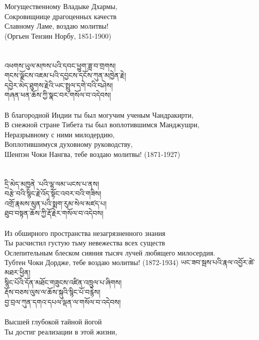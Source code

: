 Могущественному Владыке Дхармы, \\
Сокровищнице драгоценных качеств \\
Славному Ламе, воздаю молитвы! \\ 
\hspace{1cm} (Оргьен Тензин Норбу, 1851-1900)\\
\\
\\
\ti
འཕགས་ཡུལ་མཁས་པའི་དབང་ཕྱུག་ཟླ་བ་གྲགས། \\
གངས་ལྗོངས་འཇམ་པའི་དབྱངས་དངོས་ཀུན་མཁྱེན་རྗེ། \\
དབྱེར་མེད་ཐུགས་རྗེའི་ཡང་སྤྲུལ་དགེ་བའི་བཤེས། \\
གཞན་ཕན་ཆོས་ཀྱི་སྣང་བར་གསོལ་བ་འདེབས།\\
\\
\ru
В благородной Индии ты был могучим ученым Чандракирти,\\
В снежной стране Тибета ты был воплотившимся Манджушри,\\
Неразрывному с ними милодердию, \\
Воплотившимуся духовному руководству, \\
Шенпэн Чоки Нангва, тебе воздаю молитвы! (1871-1927)\\
\\
\\
\ti
དྲི་མེད་མཁྱནེ ་པའི་ལྷ་ལམ་ཡངས་པ་ནས། \\
བརྩེ་བའི་སྙིང་རྗེ་འོད་སྟོང་འབར་བའི་གཟིས། \\
འགྲོ་རྣམས་མུན་པའི་སྨག་རུམ་སེལ་མཛད་པ། \\
ཐུབ་བསྟན་ཆོས་ཀྱི་རྡོ་རྗེར་གསོལ་བ་འདེབས།\\
\\
\ru
Из обширного пространства незагрязненного знания\\
Ты расчистил густую тьму невежества всех существ\\
Ослепительным блеском сияния тысяч лучей любящего милосердия. \\
Тубтен Чоки Дордже, тебе воздаю молитвы! (1872-1934)
\newpage
\ti
ཡང་ཟབ་སྦས་པའི་རྣལ་འབྱོར་ཚེ་མཐར་ཕྱིན། \\
སྙིང་པོའི་དོན་མཐོང་གཟུངས་འཛིན་འཁྲུལ་པ་ཞིགས། \\
རྡོས་བཅས་ལུས་ལ་ཆོས་སྐུའི་སྙིང་པོ་བརྙེས། \\
བྱ་བྲལ་ཀུན་དགའ་དཔལ་ལྡན་ལ་གསོལ་བ་འདེབས།\\
\\
\ru
Высшей глубокой тайной йогой \\ Ты достиг реализации в этой жизни,\\
